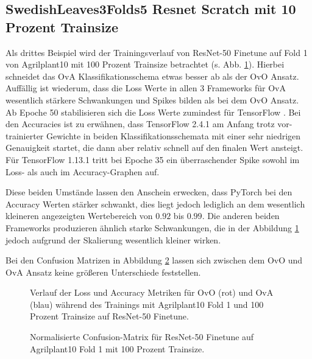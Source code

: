 \subsection{SwedishLeaves3Folds5 Resnet Scratch mit 10 Prozent Trainsize}
\label{ch:BeispielC}
Als drittes Beispiel wird der Trainingsverlauf von ResNet-50 Finetune auf Fold 1 von Agrilplant10 mit 100 Prozent Trainsize betrachtet (s. Abb. \ref{fig:TrainingsverlaufC}).
Hierbei schneidet das OvA Klassifikationsschema etwas besser ab als der OvO Ansatz. Auffällig ist wiederum, dass die Loss Werte in allen 3 Frameworks für OvA wesentlich stärkere Schwankungen und Spikes bilden als bei dem OvO Ansatz. Ab Epoche 50 stabilisieren sich die Loss Werte zumindest für TensorFlow \cite{tensorflow}.
Bei den Accuracies ist zu erwähnen, dass TensorFlow 2.4.1 \cite{tensorflow} am Anfang trotz vor-trainierter Gewichte in beiden Klassifikationsschemata mit einer sehr niedrigen Genauigkeit startet, die dann aber relativ schnell auf den finalen Wert ansteigt. Für TensorFlow 1.13.1 \cite{tensorflow} tritt bei Epoche 35 ein überraschender Spike sowohl im Loss- als auch im Accuracy-Graphen auf.

Diese beiden Umstände lassen den Anschein erwecken, dass PyTorch \cite{pytorch} bei den Accuracy Werten stärker schwankt, dies liegt jedoch lediglich an dem wesentlich kleineren angezeigten Wertebereich von $0.92$ bis $0.99$. Die anderen beiden Frameworks produzieren ähnlich starke Schwankungen, die in der Abbildung \ref{fig:TrainingsverlaufC} jedoch aufgrund der Skalierung wesentlich kleiner wirken.

Bei den Confusion Matrizen in Abbildung \ref{fig:ConfusionMatrixC} lassen sich zwischen dem OvO und OvA Ansatz keine größeren Unterschiede feststellen.

\begin{figure}[H]
\begin{adjustbox}{width=1.4\textwidth, center}

\end{adjustbox}
\caption{Verlauf der Loss und Accuracy Metriken für OvO (rot) und OvA (blau) während des Trainings mit Agrilplant10 Fold 1 und 100 Prozent Trainsize auf ResNet-50 Finetune.}
\label{fig:TrainingsverlaufC}
\end{figure}

\begin{figure}[H]
\begin{adjustbox}{width=1.1\textwidth, center}

\end{adjustbox}
\caption{Normalisierte Confusion-Matrix für ResNet-50 Finetune auf Agrilplant10 Fold 1 mit 100 Prozent Trainsize.}
\label{fig:ConfusionMatrixC}
\end{figure}


